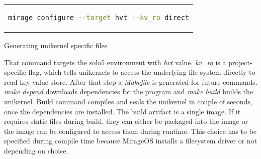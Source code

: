 \begin{code}[htpb]
    \centering
    \begin{tabular}{c}
    \begin{lstlisting}[language=bash]
      mirage configure --target hvt --kv_ro direct
  \end{lstlisting}
  \end{tabular}
  \caption{Generating unikernel specific files}\label{fig:mirage_configure}
\end{code}

That command targets the solo5 environment with \textit{hvt} value. \textit{kv\_ro} is a project-specific flag, which tells unikernels to access the underlying file system directly to read key-value store. After that step a \textit{Makefile} is generated for future commands. \textit{make depend} downloads dependencies for the program and \textit{make build} builds the unikernel. Build command compiles and seals the unikernel in couple of seconds, once the dependencies are installed. The build artifact is a single image. If it requires static files during build, they can either be packaged into the image or the image can be configured to access them during runtime. This choice has to be specified during compile time because MirageOS installs a filesystem driver or not depending on choice.
